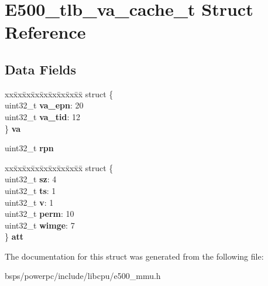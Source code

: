 \hypertarget{structE500__tlb__va__cache__t}{}\section{E500\+\_\+tlb\+\_\+va\+\_\+cache\+\_\+t Struct Reference}
\label{structE500__tlb__va__cache__t}
\subsection*{Data Fields}
\begin{DoxyCompactItemize}
\item 
\mbox{\label{structE500__tlb__va__cache__t_a8e66bc43a19a736155510e77da18cac0}} 
\begin{tabbing}
xx\=xx\=xx\=xx\=xx\=xx\=xx\=xx\=xx\=\kill
struct \{\\
\>uint32\_t {\bfseries va\_epn}: 20\\
\>uint32\_t {\bfseries va\_tid}: 12\\
\} {\bfseries va}\\

\end{tabbing}\item 
\mbox{\label{structE500__tlb__va__cache__t_a0141927c8d69323091229404b0218bf6}} 
uint32\+\_\+t {\bfseries rpn}
\item 
\mbox{\label{structE500__tlb__va__cache__t_afd93c724940f0c546411f51efa4da840}} 
\begin{tabbing}
xx\=xx\=xx\=xx\=xx\=xx\=xx\=xx\=xx\=\kill
struct \{\\
\>uint32\_t {\bfseries sz}: 4\\
\>uint32\_t {\bfseries ts}: 1\\
\>uint32\_t {\bfseries v}: 1\\
\>uint32\_t {\bfseries perm}: 10\\
\>uint32\_t {\bfseries wimge}: 7\\
\} {\bfseries att}\\

\end{tabbing}\end{DoxyCompactItemize}


The documentation for this struct was generated from the following file\+:\begin{DoxyCompactItemize}
\item 
bsps/powerpc/include/libcpu/e500\+\_\+mmu.\+h\end{DoxyCompactItemize}
